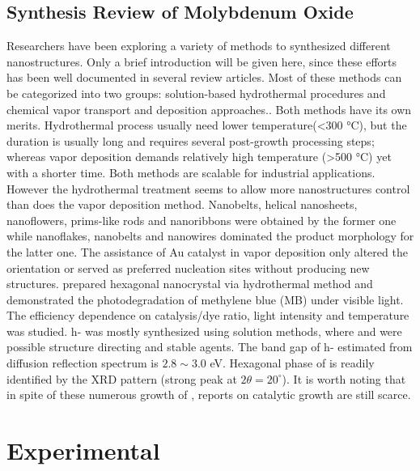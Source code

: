 \subsection{Synthesis Review of Molybdenum Oxide}

Researchers have been exploring a variety of methods to synthesized different  nanostructures. Only a brief introduction will be given here, since these efforts has been well documented in several review articles.\cite{He2003} Most of these methods can be categorized into two groups: solution-based hydrothermal procedures \citep{Li2002b,Xia2006,Li2006a,Camacho-Bragado2006} and chemical vapor transport and deposition approaches.\citep{Zeng1998,Li2002c,Li2002d,Zhou2003b,Fibers2007,Yan2009}. Both methods have its own merits. Hydrothermal process usually need lower temperature(\textless 300 \si{\degreeCelsius}), but the duration is usually long and requires several post-growth processing steps; whereas vapor deposition demands relatively high temperature (\textgreater 500 \si{\degreeCelsius}) yet with a shorter time. Both methods are scalable for industrial applications. However the hydrothermal treatment seems to allow more  nanostructures control than does the vapor deposition method. Nanobelts,\cite{Li2002b} helical nanosheets, nanoflowers, prims-like rods\cite{Li2006a} and nanoribbons\cite{Camacho-Bragado2006} were obtained by the former one while nanoflakes,\cite{Chen2009} nanobelts\cite{Hu2009} and nanowires\citep{Zhou2003b,Chen2011b} dominated the product morphology for the latter one. The assistance of Au catalyst in vapor deposition only altered the orientation\cite{Yan2009} or served as preferred nucleation sites\cite{Cai2011} without producing new  structures. \citeauthor{Chithambararaj2013} prepared hexagonal  nanocrystal via hydrothermal method and demonstrated the photodegradation of methylene blue (MB) under visible light.\cite{Chithambararaj2013} The efficiency dependence on catalysis/dye ratio, light intensity and temperature was studied. h- was mostly synthesized using solution methods, where  and  were possible structure directing and stable agents. The band gap of h- estimated from diffusion reflection spectrum is $2.8\sim3.0$ eV. Hexagonal phase of  is readily identified by the XRD pattern (strong peak at $2\theta=20^{\circ}$). It is worth noting that in spite of these numerous growth of , reports on catalytic growth are still scarce. 

\section{Experimental}\label{sec:grow}

